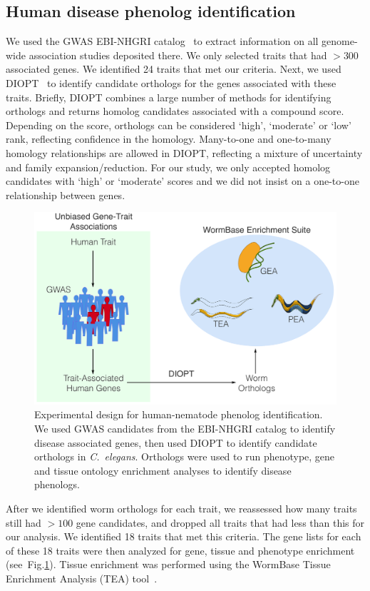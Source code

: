 \documentclass[10pt, onecolumn]{article}
\newcommand{\cel}{\emph{C.~elegans}}
\begin{document}
\subsection*{Human disease phenolog identification}
We used the GWAS EBI-NHGRI catalog~\cite{MacArthur2016} to extract information
on all genome-wide association studies deposited there. We only selected traits
that had $>300$ associated genes. We identified 24 traits that met our criteria.
Next, we used DIOPT~\cite{Hu2011} to identify candidate orthologs for the genes
associated with these traits. Briefly, DIOPT combines a large number of methods
for identifying orthologs and returns homolog candidates associated with a
compound score. Depending on the score, orthologs can be considered `high',
`moderate' or `low' rank, reflecting confidence in the homology. Many-to-one and
one-to-many homology relationships are allowed in DIOPT, reflecting a mixture of
uncertainty and family expansion/reduction. For our study, we only accepted
homolog candidates with `high' or `moderate' scores and we did not insist on a
one-to-one relationship between genes.

\begin{figure}[htbp]
  \renewcommand{\familydefault}{\sfdefault}\normalfont{}
  \centering
  \includegraphics[width=.5\linewidth]{gwas-design.pdf}
  \caption{Experimental design for human-nematode phenolog identification.
           We used GWAS candidates from the EBI-NHGRI catalog to identify
           disease associated genes, then used DIOPT to identify candidate
           orthologs in \cel{}. Orthologs were used to run phenotype, gene
           and tissue ontology enrichment analyses to identify disease
           phenologs.}
\label{fig:gwas}
\end{figure}


After we identified worm orthologs for each trait, we reassessed how many traits
still had $>100$ gene candidates, and dropped all traits that had less than this
for our analysis. We identified 18 traits that met this criteria. The gene lists
for each of these 18 traits were then analyzed for gene, tissue and phenotype
enrichment (see~Fig.\ref{fig:gwas}). Tissue enrichment was performed using the
WormBase Tissue Enrichment Analysis (TEA) tool~\cite{Angeles-Albores2016}.
\end{document}
